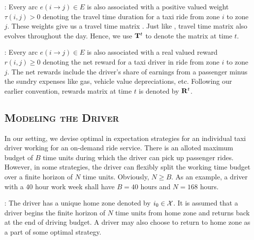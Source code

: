 
:
Every arc $e(i\rightarrow j) \in E$ is also associated with a positive valued weight $\tau(i,j) > 0$ 
denoting the travel time duration for a taxi ride from zone $i$ to zone $j$. 
These weights give us a travel time matrix {\traveltimematrix}. 
Just like {\empiricaltransitionmatrix},  travel time matrix also evolves throughout the day. 
Hence, we use ${\mathbf{T}}^t$ to denote the matrix at time $t$.


:
Every arc $e(i \rightarrow j) \in E$ is also associated with a real valued reward $r(i,j) \geq 0$ denoting
the net reward for a taxi driver in ride from zone $i$ to zone $j$. The net rewards include the driver's
share of earnings from a passenger minus the sundry expenses like gas, vehicle value depreciations, etc.
Following our earlier convention, rewards matrix at time $t$ is denoted by ${\mathbf{R}}^t$.

\subsection{\textsc{Modeling the Driver}}

In our setting, we devise optimal in expectation strategies for an individual taxi driver working for an
on-demand ride service. There is an alloted maximum budget of $B$ time units during which the driver can pick
up passenger rides. However, in some strategies, the driver can flexibly split the working time budget 
over a finite horizon of $N$ time units. Obviously, $N \geq B$. As an example, a driver with a 40 hour work week
shall have $B=40$ hours and $N=168$ hours.


: 
The driver has a unique home zone denoted by $i_0 \in \mathcal{X}$. It is assumed that a driver begins the finite horizon of $N$
time units from home zone and returns back at the end of driving budget. A driver may also choose to return to 
home zone as a part of some optimal strategy.

